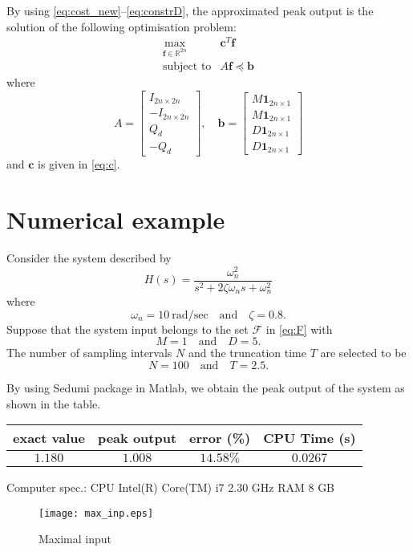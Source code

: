\documentclass[a4paper,11pt]{article}
\theoremstyle{definition}
\begin{document}
By using \eqref{eq:cost_new}--\eqref{eq:constrD},
    the approximated peak output is the solution of the following optimisation problem:
\begin{equation}\label{eq:LP}
    \begin{array}{cc}
    \displaystyle{\max_{\mathbf{f}\in\mathbb{R}^{2n}}} & \mathbf{c}^T\mathbf{f}\\
    \text{subject to} & A\mathbf{f} \preceq \mathbf{b}
    \end{array}
\end{equation}    
where 
\[
    A = \begin{bmatrix} I_{2n\times 2n}\\ -I_{2n\times 2n}\\ Q_d\\ -Q_d\end{bmatrix},\quad 
    \mathbf{b} =  \begin{bmatrix} M\mathbf{1}_{2n\times 1}\\ M\mathbf{1}_{2n\times 1}\\
                                                   D\mathbf{1}_{2n\times 1}\\ D\mathbf{1}_{2n\times 1}\end{bmatrix}
\]
    and $\mathbf{c}$ is given in \eqref{eq:c}.
    
    
\newpage
\section{Numerical example}
Consider the system described by
\[
    H(s) = \frac{\omega_n^2}{s^2 + 2\zeta\omega_n s + \omega_n^2}
\]
where 
\[
    \omega_n = 10 \ \mathrm{rad/sec} \quad \text{and}\quad \zeta = 0.8.
\]
Suppose that the system input belongs to the set $\mathcal{F}$ in \eqref{eq:F} with
\[
    M = 1\quad \text{and}\quad D = 5.
\]
The number of sampling intervals $N$ and the truncation time $T$ are selected to be
\[
    N = 100\quad \text{and}\quad T = 2.5.
\]


By using Sedumi package in Matlab, we obtain the peak output of the system as shown in the table.



\begin{table}[h]
\begin{center}
\vspace{1cm}
\begin{tabular}{|c|c|c|c|}
\hline
 exact value  & peak output & error (\%)& CPU Time (s)\\ 
\hline
$1.180$ & $1.008$ & $14.58\%$ & $0.0267$\\
\hline
\end{tabular}
\end{center}
\end{table}

\noindent
Computer spec.: CPU Intel(R) Core(TM) i7 2.30 GHz RAM 8 GB
\begin{figure}[h]
\begin{center}
\texttt{[image: max\_inp.eps]}
\end{center}
\caption{Maximal input}
\end{figure}
\end{document}
